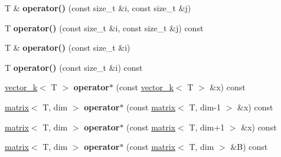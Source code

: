 \begin{DoxyCompactItemize}
\item 
\hypertarget{classkeycpp_1_1matrix_ab3ac80a8839ee1367ed5d6dc2a4f10a1}{T \& {\bfseries operator()} (const size\-\_\-t \&i, const size\-\_\-t \&j)}\label{classkeycpp_1_1matrix_ab3ac80a8839ee1367ed5d6dc2a4f10a1}

\item 
\hypertarget{classkeycpp_1_1matrix_a09dd98285ca087613b94dceaf2cdd04d}{T {\bfseries operator()} (const size\-\_\-t \&i, const size\-\_\-t \&j) const }\label{classkeycpp_1_1matrix_a09dd98285ca087613b94dceaf2cdd04d}

\item 
\hypertarget{classkeycpp_1_1matrix_af19189228f639be9356bf782d546cfbd}{T \& {\bfseries operator()} (const size\-\_\-t \&i)}\label{classkeycpp_1_1matrix_af19189228f639be9356bf782d546cfbd}

\item 
\hypertarget{classkeycpp_1_1matrix_ae20c2af1bdff8d29a66a96736794d0ce}{T {\bfseries operator()} (const size\-\_\-t \&i) const }\label{classkeycpp_1_1matrix_ae20c2af1bdff8d29a66a96736794d0ce}

\item 
\hypertarget{classkeycpp_1_1matrix_a7b1ad6983d1e6775d40ee1f6f1a7c96e}{\hyperlink{classkeycpp_1_1vector__k}{vector\-\_\-k}$<$ T $>$ {\bfseries operator$\ast$} (const \hyperlink{classkeycpp_1_1vector__k}{vector\-\_\-k}$<$ T $>$ \&x) const }\label{classkeycpp_1_1matrix_a7b1ad6983d1e6775d40ee1f6f1a7c96e}

\item 
\hypertarget{classkeycpp_1_1matrix_a90597c8d2c329df1af5b19b6c3ff2090}{\hyperlink{classkeycpp_1_1matrix}{matrix}$<$ T, dim $>$ {\bfseries operator$\ast$} (const \hyperlink{classkeycpp_1_1matrix}{matrix}$<$ T, dim-\/1 $>$ \&x) const }\label{classkeycpp_1_1matrix_a90597c8d2c329df1af5b19b6c3ff2090}

\item 
\hypertarget{classkeycpp_1_1matrix_aa9f050a30d89a2227deec4104dbc199a}{\hyperlink{classkeycpp_1_1matrix}{matrix}$<$ T, dim $>$ {\bfseries operator$\ast$} (const \hyperlink{classkeycpp_1_1matrix}{matrix}$<$ T, dim+1 $>$ \&x) const }\label{classkeycpp_1_1matrix_aa9f050a30d89a2227deec4104dbc199a}

\item 
\hypertarget{classkeycpp_1_1matrix_a236aef5e4713073df5b56000711028e2}{\hyperlink{classkeycpp_1_1matrix}{matrix}$<$ T, dim $>$ {\bfseries operator$\ast$} (const \hyperlink{classkeycpp_1_1matrix}{matrix}$<$ T, dim $>$ \&B) const }\label{classkeycpp_1_1matrix_a236aef5e4713073df5b56000711028e2}


\end{DoxyCompactItemize}
